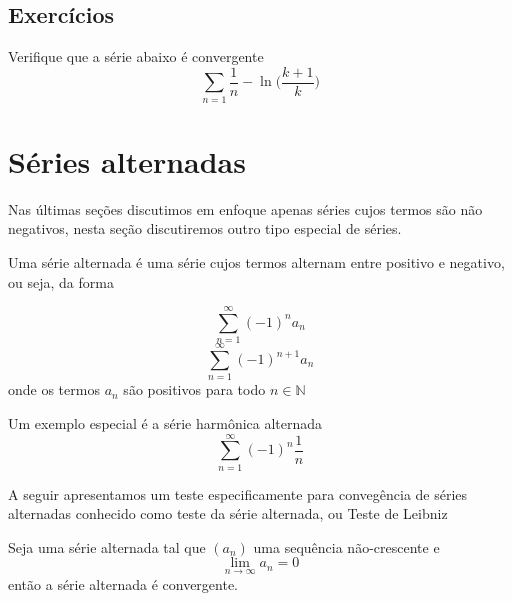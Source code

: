 \subsection*{Exercícios}

\construirExer

\begin{exer}
    Verifique que a série abaixo é convergente
    $$\sum_{n = 1} \frac{1}{n}-\ln \bigg(\frac{k+1}{k} \bigg) $$
\end{exer}


\section{Séries alternadas}
\construirSec

Nas últimas seções discutimos em enfoque apenas séries cujos termos são não
negativos, nesta seção discutiremos outro tipo especial de séries.

Uma série alternada é uma série cujos termos alternam entre positivo e negativo,
ou seja, da forma 

$$\sum_{n =1}^{\infty} (-1)^n a_n$$
$$\sum_{n =1}^{\infty} (-1)^{n+1} a_n$$
onde os termos $a_n$ são positivos para todo $n \in \mathbb{N}$
\begin{ex}
    Um exemplo especial é a série harmônica alternada
    $$\sum_{n =1}^{\infty} (-1)^n \frac{1}{n}$$
\end{ex}

A seguir apresentamos um teste especificamente para convegência 
de séries alternadas conhecido como teste da série alternada, ou Teste de Leibniz

\begin{teo}
    Seja uma série alternada tal que $(a_n)$ uma sequência não-crescente e
    $$\lim_{n \to \infty} a_n = 0$$
    então a série alternada é convergente.
\end{teo}

